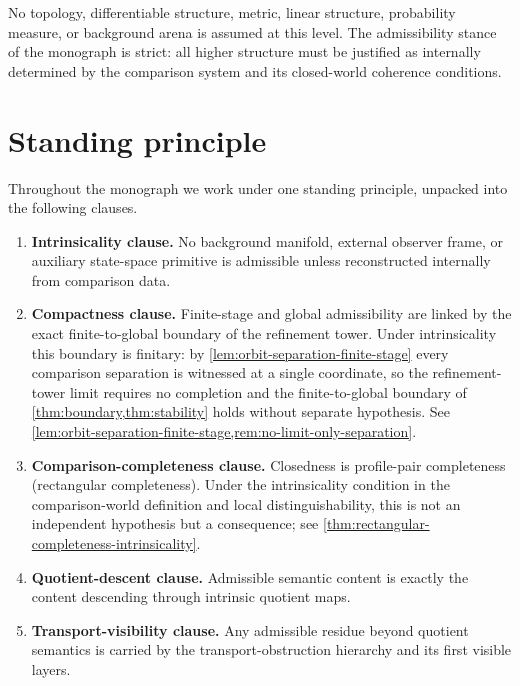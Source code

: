 No topology, differentiable structure, metric, linear structure,
probability measure, or background arena is assumed at this level.
The admissibility stance of the monograph is strict:
all higher structure must be justified as internally determined by the
comparison system and its closed-world coherence conditions.

\section{Standing principle}
\begin{standingprinciple}
\label{sp:closed-world}
Throughout the monograph we work under one standing principle, unpacked
into the following clauses.
\begin{enumerate}[label=\textup{(SP\arabic*)}]
\item\label{sp:intrinsic}
      \textbf{Intrinsicality clause.}
      No background manifold, external observer frame, or auxiliary
      state-space primitive is admissible unless reconstructed internally
      from comparison data.
\item\label{sp:compactness}
      \textbf{Compactness clause.}
	  Finite-stage and global admissibility are linked by the exact
	  finite-to-global boundary of the refinement tower. Under
	  intrinsicality this boundary is finitary: by
	  \cref{lem:orbit-separation-finite-stage} every comparison separation is
	  witnessed at a single coordinate, so the refinement-tower limit requires
	  no completion and the finite-to-global boundary of
	  \cref{thm:boundary,thm:stability} holds without separate hypothesis. See
	  \cref{lem:orbit-separation-finite-stage,rem:no-limit-only-separation}.
\item\label{sp:closure}
	  \textbf{Comparison-completeness clause.}
	  Closedness is profile-pair completeness (rectangular completeness).
	  Under the intrinsicality condition in the comparison-world definition
	  and local
	  distinguishability, this is not an independent hypothesis but a
	  consequence; see \cref{thm:rectangular-completeness-intrinsicality}.
\item\label{sp:quotient}
	      \textbf{Quotient-descent clause.}
      Admissible semantic content is exactly the content descending through
      intrinsic quotient maps.
\item\label{sp:transport}
      \textbf{Transport-visibility clause.}
      Any admissible residue beyond quotient semantics is carried by the
      transport-obstruction hierarchy and its first visible layers.
\end{enumerate}
\end{standingprinciple}
